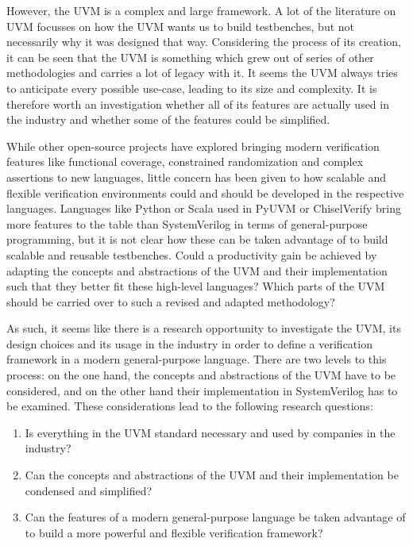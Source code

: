 However, the UVM is a complex and large framework. A lot of the literature on UVM focusses on how the UVM wants us to
build testbenches, but not necessarily why it was designed that way. Considering the process of its creation, it can
be seen that the UVM is something which grew
out of series of other methodologies and carries a lot of legacy with it. It seems the UVM always tries to anticipate
every possible use-case, leading to its size and complexity. It is therefore worth an investigation whether all of
its features are actually used in the industry and whether some of the features could be simplified.

While other open-source projects have explored bringing modern verification features like functional coverage,
constrained randomization and complex assertions to new languages, little concern has been given to how scalable and
flexible verification environments could and should be developed in the respective languages. Languages like Python
or Scala used in PyUVM or ChiselVerify bring more features to the table than SystemVerilog in terms of
general-purpose programming, but it is not clear how these can be taken advantage of to build scalable and reusable
testbenches. Could a productivity gain be achieved by adapting the concepts and abstractions of the UVM and their
implementation such that they better fit these high-level languages? Which parts of the UVM should be carried over to
such a revised and adapted methodology?

As such, it seems like there is a research opportunity to investigate the UVM, its design choices and its usage in
the industry in order to define a verification framework in a modern general-purpose language. There are two levels
to this process: on the one hand, the concepts and abstractions of the UVM have to be considered, and on the other
hand their implementation in SystemVerilog has to be examined. These considerations lead to the following research questions:

\begin{enumerate}
  \item Is everything in the UVM standard necessary and used by companies in the industry?
  \item Can the concepts and abstractions of the UVM and their implementation be condensed and simplified?
  \item Can the features of a modern general-purpose language be taken advantage of to build a more powerful and
    flexible verification framework?
\end{enumerate}

